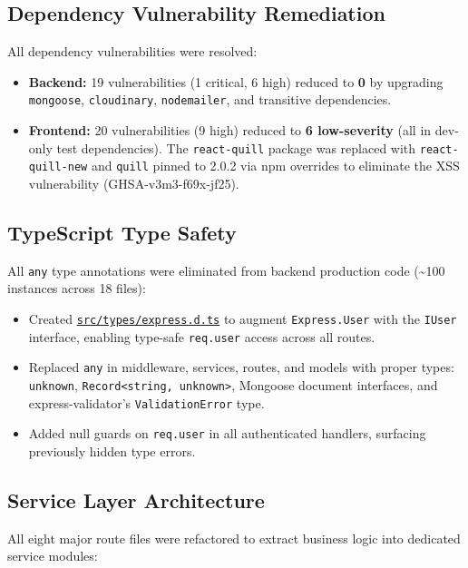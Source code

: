 \documentclass[12pt,letterpaper]{article}
\newcommand{\ghrepo}{https://github.com/omniV1/lunaraCare}
\begin{document}
\subsection{Dependency Vulnerability Remediation}

All dependency vulnerabilities were resolved:

\begin{itemize}[nosep]
  \item \textbf{Backend:} 19 vulnerabilities (1 critical, 6 high) reduced to \textbf{0} by upgrading \texttt{mongoose}, \texttt{cloudinary}, \texttt{nodemailer}, and transitive dependencies.
  \item \textbf{Frontend:} 20 vulnerabilities (9 high) reduced to \textbf{6 low-severity} (all in dev-only test dependencies). The \texttt{react-quill} package was replaced with \texttt{react-quill-new} and \texttt{quill} pinned to 2.0.2 via npm overrides to eliminate the XSS vulnerability (GHSA-v3m3-f69x-jf25).
\end{itemize}

\subsection{TypeScript Type Safety}

All \texttt{any} type annotations were eliminated from backend production code (\textasciitilde100 instances across 18 files):

\begin{itemize}[nosep]
  \item Created \href{\ghrepo/blob/main/backend/src/types/express.d.ts}{\texttt{src/types/express.d.ts}} to augment \texttt{Express.User} with the \texttt{IUser} interface, enabling type-safe \texttt{req.user} access across all routes.
  \item Replaced \texttt{any} in middleware, services, routes, and models with proper types: \texttt{unknown}, \texttt{Record<string, unknown>}, Mongoose document interfaces, and express-validator's \texttt{ValidationError} type.
  \item Added null guards on \texttt{req.user} in all authenticated handlers, surfacing previously hidden type errors.
\end{itemize}

\subsection{Service Layer Architecture}

All eight major route files were refactored to extract business logic into dedicated service modules:
\end{document}
